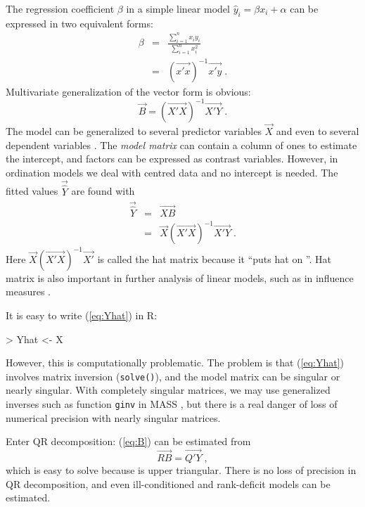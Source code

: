 The regression coefficient $\beta$ in a simple linear model $\hat y_i
= \beta x_i + \alpha$ can be expressed in two equivalent forms:
\begin{eqnarray}
  \beta &=& \frac{\sum_{i=1}^n x_i y_i}{\sum_{i=1}^n x_i^2}\\
  &=& (\vec{x'x})^{-1} \vec{x'y} \;.
\end{eqnarray}
Multivariate generalization of the vector form is obvious:
\begin{equation}
  \label{eq:B}
  \vec{B} = (\vec{X'X})^{-1} \vec{X'Y}\;.
\end{equation}
The model can be generalized to several predictor variables $\vec{X}$
and even to several dependent variables .  The \emph{model matrix}
  can contain a column of ones to estimate the
intercept, and factors can be expressed as contrast variables.
However, in ordination models we deal with centred data and no
intercept is needed. The fitted values $\vec{\hat Y}$ are found with
\begin{eqnarray}
 \vec{\hat Y} &=& \vec{XB} \\
  \label{eq:Yhat}
&=& \vec{X} (\vec{X'X})^{-1} \vec{X'Y}\;.
\end{eqnarray}
Here $\vec{X} (\vec{X'X})^{-1} \vec{X'}$ is called the hat matrix
because it ``puts hat on ''. Hat matrix is also important in
further analysis of linear models, such as in influence measures
\citep{BlueBook}.

It is easy to write (\ref{eq:Yhat}) in R:

\begin{Schunk}
\begin{Sinput}
> Yhat <- X %*% solve(t(X) %*% X) %*% t(X) %*% Y
\end{Sinput}
\end{Schunk}
However, this is computationally problematic.  The problem is that
(\ref{eq:Yhat}) involves matrix inversion (\texttt{solve()}), and the
model matrix  can be singular or nearly singular. With
completely singular matrices, we may use generalized inverses such as
function \texttt{ginv} in MASS \citep{MASS}, but there is a real
danger of loss of numerical precision with nearly singular matrices.

Enter QR decomposition: (\ref{eq:B}) can be estimated from
\begin{equation}
  \vec{RB} = \vec{Q'Y}\;,
\end{equation}
which is easy to solve because  is upper triangular.  There is
no loss of precision in QR decomposition, and even ill-conditioned and
rank-deficit models can be estimated.

